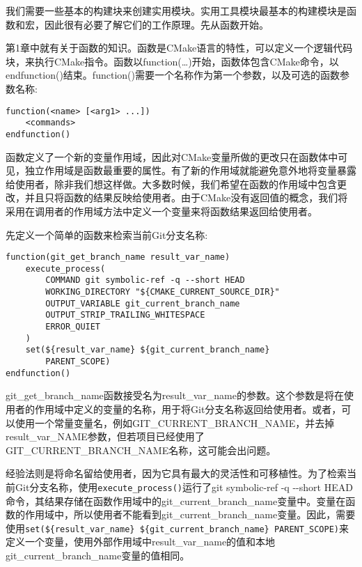 
我们需要一些基本的构建块来创建实用模块。实用工具模块最基本的构建模块是函数和宏，因此很有必要了解它们的工作原理。先从函数开始。


第1章中就有关于函数的知识。函数是CMake语言的特性，可以定义一个逻辑代码块，来执行CMake指令。函数以function(…)开始，函数体包含CMake命令，以endfunction()结束。function()需要一个名称作为第一个参数，以及可选的函数参数名称:

\begin{lstlisting}[style=styleCMake]
function(<name> [<arg1> ...])
	<commands>
endfunction()
\end{lstlisting}

函数定义了一个新的变量作用域，因此对CMake变量所做的更改只在函数体中可见，独立作用域是函数最重要的属性。有了新的作用域就能避免意外地将变量暴露给使用者，除非我们想这样做。大多数时候，我们希望在函数的作用域中包含更改，并且只将函数的结果反映给使用者。由于CMake没有返回值的概念，我们将采用在调用者的作用域方法中定义一个变量来将函数结果返回给使用者。

先定义一个简单的函数来检索当前Git分支名称:

\begin{lstlisting}[style=styleCMake]
function(git_get_branch_name result_var_name)
	execute_process(
		COMMAND git symbolic-ref -q --short HEAD
		WORKING_DIRECTORY "${CMAKE_CURRENT_SOURCE_DIR}"
		OUTPUT_VARIABLE git_current_branch_name
		OUTPUT_STRIP_TRAILING_WHITESPACE
		ERROR_QUIET
	)
	set(${result_var_name} ${git_current_branch_name}
		PARENT_SCOPE)
endfunction()
\end{lstlisting}

git\_get\_branch\_name函数接受名为result\_var\_name的参数。这个参数是将在使用者的作用域中定义的变量的名称，用于将Git分支名称返回给使用者。或者，可以使用一个常量变量名，例如GIT\_CURRENT\_BRANCH\_NAME，并去掉result\_var\_NAME参数，但若项目已经使用了GIT\_CURRENT\_BRANCH\_NAME名称，这可能会出问题。

经验法则是将命名留给使用者，因为它具有最大的灵活性和可移植性。为了检索当前Git分支名称，使用\texttt{execute\_process()}运行了git symbolic-ref -q -{}-short HEAD命令，其结果存储在函数作用域中的git\_current\_branch\_name变量中。变量在函数的作用域中，所以使用者不能看到git\_current\_branch\_name变量。因此，需要使用\texttt{set(\$\{result\_var\_name\} \$\{git\_current\_branch\_name\} PARENT\_SCOPE)}来定义一个变量，使用外部作用域中result\_var\_name的值和本地git\_current\_branch\_name变量的值相同。

